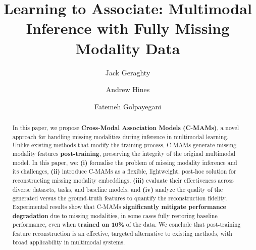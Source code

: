 \documentclass[manuscript,screen]{acmart}
\begin{document}
\title{Learning to Associate: Multimodal Inference with Fully Missing Modality Data}

\author{Jack Geraghty}

\author{Andrew Hines}

\author{Fatemeh Golpayegani}




\begin{abstract}
In this paper, we propose \textbf{Cross-Modal Association Models (C-MAMs)}, a novel approach for handling missing modalities during inference in multimodal learning. 
Unlike existing methods that modify the training process, C-MAMs generate missing modality features \textbf{post-training}, preserving the integrity of the original multimodal model. 
In this paper, we: \textbf{(i)} formalise the problem of missing modality inference and its challenges, \textbf{(ii)} introduce C-MAMs as a flexible, lightweight, post-hoc solution for reconstructing missing modality embeddings, \textbf{(iii)} evaluate their effectiveness across diverse datasets, tasks, and baseline models, and \textbf{(iv)} analyze the quality of the generated versus the ground-truth features to quantify the reconstruction fidelity. 
Experimental results show that C-MAMs \textbf{significantly mitigate performance degradation} due to missing modalities, in some cases fully restoring baseline performance, even when \textbf{trained on 10\%} of the data. 
We conclude that post-training feature reconstruction is an effective, targeted alternative to existing methods, with broad applicability in multimodal systems.
\end{abstract}
\end{document}
